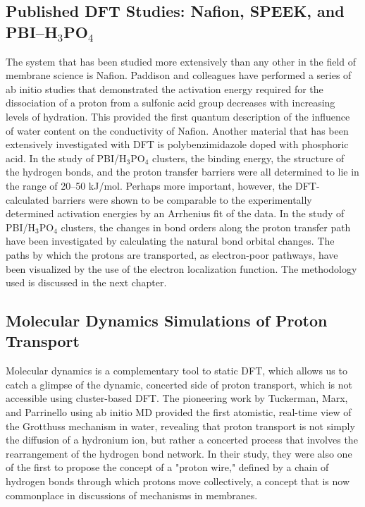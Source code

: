 \documentclass[12pt,a4paper]{report}
\begin{document}
\subsection{Published DFT Studies: Nafion, SPEEK, and PBI–H\(_3\)PO\(_4\)}
The system that has been studied more extensively than any other in the field of membrane science is Nafion. Paddison and colleagues have performed a series of ab initio studies that demonstrated the activation energy required for the dissociation of a proton from a sulfonic acid group decreases with increasing levels of hydration. This provided the first quantum description of the influence of water content on the conductivity of Nafion.\cite{18,19}
Another material that has been extensively investigated with DFT is polybenzimidazole doped with phosphoric acid. In the study of PBI/H\(_3\)PO\(_4\) clusters, the binding energy, the structure of the hydrogen bonds, and the proton transfer barriers were all determined to lie in the range of 20–50 kJ/mol.\cite{20,59} Perhaps more important, however, the DFT-calculated barriers were shown to be comparable to the experimentally determined activation energies by an Arrhenius fit of the data. In the study of PBI/H\(_3\)PO\(_4\) clusters, the changes in bond orders along the proton transfer path have been investigated by calculating the natural bond orbital changes. The paths by which the protons are transported, as electron-poor pathways, have been visualized by the use of the electron localization function. The methodology used is discussed in the next chapter.

\subsection{Molecular Dynamics Simulations of Proton Transport}
Molecular dynamics is a complementary tool to static DFT, which allows us to catch a glimpse of the dynamic, concerted side of proton transport, which is not accessible using cluster-based DFT. The pioneering work by Tuckerman, Marx, and Parrinello using ab initio MD provided the first atomistic, real-time view of the Grotthuss mechanism in water, revealing that proton transport is not simply the diffusion of a hydronium ion, but rather a concerted process that involves the rearrangement of the hydrogen bond network.\cite{61,62} In their study, they were also one of the first to propose the concept of a "proton wire," defined by a chain of hydrogen bonds through which protons move collectively, a concept that is now commonplace in discussions of mechanisms in membranes.
\end{document}
